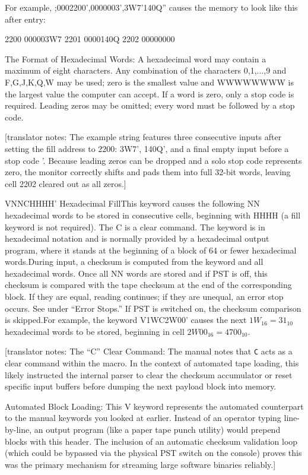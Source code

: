 \documentclass{article}
\begin{document}
\begin{enumerate}
For example, ;0002200',0000003',3W7'140Q'' causes the memory to look like this after entry:

2200 000003W7
2201 0000140Q
2202 00000000

The Format of Hexadecimal Words:
A hexadecimal word may contain a maximum of eight characters. Any combination of the characters 0,1,...,9 and F,G,J,K,Q,W may be used; zero is the smallest value and WWWWWWWW is the largest value the computer can accept. If a word is zero, only a stop code is required. Leading zeros may be omitted; every word must be followed by a stop code.

[translator notes: The example string features three consecutive inputs after setting the fill address to 2200: 3W7', 140Q', and a final empty input before a stop code '. Because leading zeros can be dropped and a solo stop code represents zero, the monitor correctly shifts and pads them into full 32-bit words, leaving cell 2202 cleared out as all zeros.]

VNNCHHHH' Hexadecimal FillThis keyword causes the following NN hexadecimal words to be stored in consecutive cells, beginning with HHHH (a fill keyword is not required). The C is a clear command. The keyword is in hexadecimal notation and is normally provided by a hexadecimal output program, where it stands at the beginning of a block of 64 or fewer hexadecimal words.During input, a checksum is computed from the keyword and all hexadecimal words. Once all NN words are stored and if PST is off, this checksum is compared with the tape checksum at the end of the corresponding block. If they are equal, reading continues; if they are unequal, an error stop occurs. See under ``Error Stops.'' If PST is switched on, the checksum comparison is skipped.For example, the keyword V1WC2W00' causes the next $1W_{16} = 31_{10}$ hexadecimal words to be stored, beginning in cell $2W00_{16} = 4700_{10}$.

[translator notes: The ``C'' Clear Command: The manual notes that \texttt{C} acts as a clear command within the macro. In the context of automated tape loading, this likely instructed the internal parser to clear the checksum accumulator or reset specific input buffers before dumping the next payload block into memory.

Automated Block Loading: This V keyword represents the automated counterpart to the manual keywords you looked at earlier. Instead of an operator typing line-by-line, an output program (like a paper tape punch utility) would prepend blocks with this header. The inclusion of an automatic checksum validation loop (which could be bypassed via the physical PST switch on the console) proves this was the primary mechanism for streaming large software binaries reliably.]


\end{enumerate}
\end{document}
